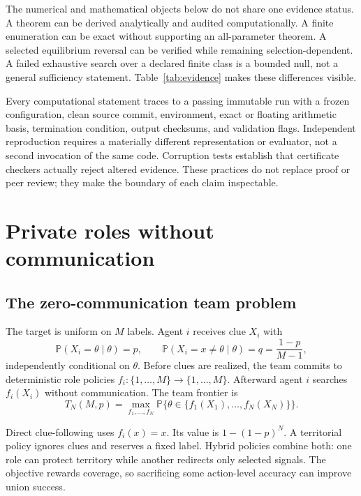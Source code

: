\documentclass[11pt]{article}
\theoremstyle{remark}
\newcommand{\Prob}{\mathbb{P}}
\begin{document}
The numerical and mathematical objects below do not share one evidence status.
A theorem can be derived analytically and audited computationally. A finite
enumeration can be exact without supporting an all-parameter theorem. A selected
equilibrium reversal can be verified while remaining selection-dependent. A
failed exhaustive search over a declared finite class is a bounded null, not a
general sufficiency statement. Table~\ref{tab:evidence} makes these differences
visible.



Every computational statement traces to a passing immutable run with a frozen
configuration, clean source commit, environment, exact or floating arithmetic
basis, termination condition, output checksums, and validation flags. Independent
reproduction requires a materially different representation or evaluator, not a
second invocation of the same code. Corruption tests establish that certificate
checkers actually reject altered evidence. These practices do not replace proof
or peer review; they make the boundary of each claim inspectable.

\section{Private roles without communication}
\subsection{The zero-communication team problem}

The target is uniform on $M$ labels. Agent $i$ receives clue $X_i$ with
\[
\Prob(X_i=\theta\mid\theta)=p,
\qquad
\Prob(X_i=x\ne\theta\mid\theta)=q=\frac{1-p}{M-1},
\]
independently conditional on $\theta$. Before clues are realized, the team commits
to deterministic role policies $f_i:\{1,\ldots,M\}\to\{1,\ldots,M\}$. Afterward
agent $i$ searches $f_i(X_i)$ without communication. The team frontier is
\[
T_N(M,p)=\max_{f_1,\ldots,f_N}
\Prob\{\theta\in\{f_1(X_1),\ldots,f_N(X_N)\}\}.
\]

Direct clue-following uses $f_i(x)=x$. Its value is
$1-(1-p)^N$. A territorial policy ignores clues and reserves a fixed label.
Hybrid policies combine both: one role can protect territory while another
redirects only selected signals. The objective rewards coverage, so sacrificing
some action-level accuracy can improve union success.
\end{document}
